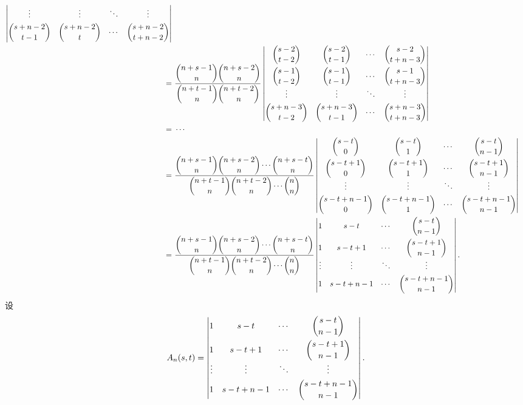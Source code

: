\documentclass{ctexart}
\begin{document}
\begin{solution}
\begin{align*}
\begin{vmatrix}
        \vdots & \vdots & \ddots & \vdots \\[4pt]
        \dbinom{s+n-2}{t-1} & \dbinom{s+n-2}{t} & \cdots & \dbinom{s+n-2}{t+n-2} \\
    \end{vmatrix} \\
        = & \ \dfrac{\dbinom{n+s-1}{n}\dbinom{n+s-2}{n}}{\dbinom{n+t-1}{n}\dbinom{n+t-2}{n}}\begin{vmatrix}
        \dbinom{s-2}{t-2} & \dbinom{s-2}{t-1} & \cdots & \dbinom{s-2}{t+n-3} \\[10pt]
        \dbinom{s-1}{t-2} & \dbinom{s-1}{t-1} & \cdots & \dbinom{s-1}{t+n-3} \\
        \vdots & \vdots & \ddots & \vdots \\[4pt]
        \dbinom{s+n-3}{t-2} & \dbinom{s+n-3}{t-1} & \cdots & \dbinom{s+n-3}{t+n-3} \\
    \end{vmatrix} \\
        = & \ \cdots \\
        = & \ \dfrac{\dbinom{n+s-1}{n}\dbinom{n+s-2}{n}\cdots\dbinom{n+s-t}{n}}{\dbinom{n+t-1}{n}\dbinom{n+t-2}{n}\cdots\dbinom{n}{n}}\begin{vmatrix}
        \dbinom{s-t}{0} & \dbinom{s-t}{1} & \cdots & \dbinom{s-t}{n-1} \\[10pt]
        \dbinom{s-t+1}{0} & \dbinom{s-t+1}{1} & \cdots & \dbinom{s-t+1}{n-1} \\
        \vdots & \vdots & \ddots & \vdots \\[4pt]
        \dbinom{s-t+n-1}{0} & \dbinom{s-t+n-1}{1} & \cdots & \dbinom{s-t+n-1}{n-1} \\
    \end{vmatrix} \\
        = & \ \dfrac{\dbinom{n+s-1}{n}\dbinom{n+s-2}{n}\cdots\dbinom{n+s-t}{n}}{\dbinom{n+t-1}{n}\dbinom{n+t-2}{n}\cdots\dbinom{n}{n}}\begin{vmatrix}
        1 & s-t & \cdots & \dbinom{s-t}{n-1} \\[10pt]
        1 & s-t+1 & \cdots & \dbinom{s-t+1}{n-1} \\
        \vdots & \vdots & \ddots & \vdots \\[4pt]
        1 & s-t+n-1 & \cdots & \dbinom{s-t+n-1}{n-1} \\
    \end{vmatrix}.
    \end{align*}
    设
    \[A_n(s,t)=\begin{vmatrix}
        1 & s-t & \cdots & \dbinom{s-t}{n-1} \\[10pt]
        1 & s-t+1 & \cdots & \dbinom{s-t+1}{n-1} \\
        \vdots & \vdots & \ddots & \vdots \\[4pt]
        1 & s-t+n-1 & \cdots & \dbinom{s-t+n-1}{n-1} \\
    \end{vmatrix}.\]
    

\end{solution}
\end{document}
